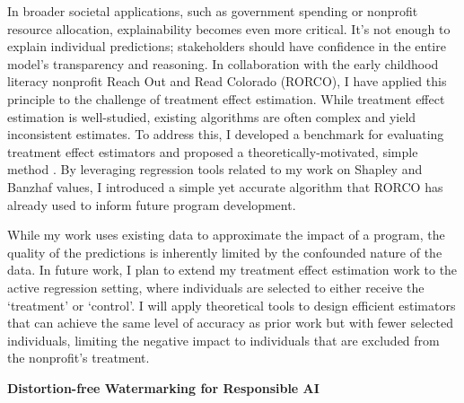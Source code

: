 \documentclass[11pt]{article}
\begin{document}
{In broader societal applications, such as government spending or nonprofit resource allocation, explainability becomes even more critical. It’s not enough to explain individual predictions; stakeholders should have confidence in the entire model’s transparency and reasoning. 
In collaboration with the early childhood literacy nonprofit Reach Out and Read Colorado (RORCO), I have applied this principle to the challenge of treatment effect estimation. While treatment effect estimation is well-studied, existing algorithms are often complex and yield inconsistent estimates. To address this, I developed a benchmark for evaluating treatment effect estimators and proposed a theoretically-motivated, simple method \cite{witter2024benchmarking}. By leveraging regression tools related to my work on Shapley and Banzhaf values, I introduced a simple yet accurate algorithm that RORCO has already used to inform future program development.

While my work uses existing data to approximate the impact of a program, the quality of the predictions is inherently limited by the confounded nature of the data. In future work, I plan to extend my treatment effect estimation work to the active regression setting, where individuals are selected to either receive the ‘treatment’ or ‘control’. 
I will apply theoretical tools to design efficient estimators that can achieve the same level of accuracy as prior work but with fewer selected individuals, limiting the negative impact to individuals that are excluded from the nonprofit’s treatment.

{ \large \textbf{Distortion-free Watermarking for Responsible AI}}

}
\end{document}
